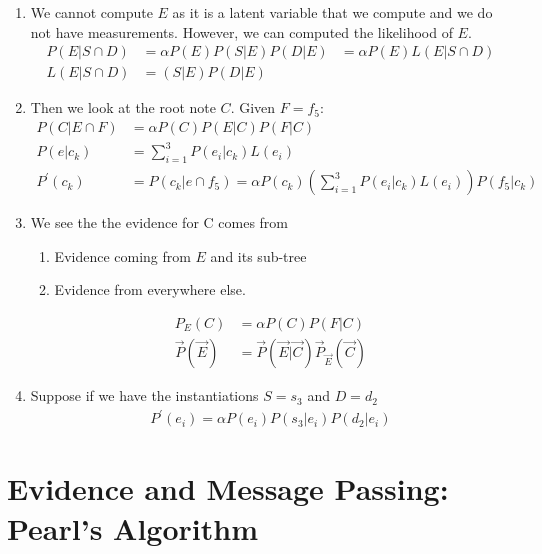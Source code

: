 \documentclass[12pt,twoside]{article}
\begin{document}
\begin{enumerate}
\begin{enumerate}
\item We cannot compute $E$ as it is a latent variable that we compute and we do not have measurements. However, we can computed the likelihood of $E$.
\begin{align*}
P(E \vert S\cap D) &= \alpha P(E)P(S\vert E)P(D\vert E)& = \alpha P(E) L(E\vert S \cap D)\\
L(E\vert S \cap D)& = (S\vert E)P(D\vert E)
\end{align*}  

\item Then we look at the root note $C$. Given $F=f_5$:
\begin{align*}
P(C \vert E \cap F)& = \alpha P(C) P(E\vert C)P(F\vert C)\\
P(e\vert c_k) &= \sum_{i=1}^3 P(e_i\vert c_k)L(e_i)\\
P^\prime (c_k)& = P(c_k\vert e \cap f_5)= \alpha P(c_k)\left(\sum_{i=1}^3 P(e_i\vert c_k)L(e_i)\right)P(f_5\vert c_k)
\end{align*}

\item We see the the evidence for C comes from
\begin{enumerate}
\item Evidence coming from $E$ and its sub-tree
\item Evidence from everywhere else.
\end{enumerate}
\begin{align*}
P_E(C) & = \alpha P(C) P(F\vert C)\\
\vec{P}(\vec{E}) & = \vec{P}(\vec{E}\vert \vec{C})\vec{P}_\vec{E}(\vec{C})
\end{align*}

\item Suppose if we have the instantiations $S=s_3$ and $D=d_2$
\begin{align*}
P^\prime(e_i) = \alpha P(e_i)P(s_3\vert e_i)P(d_2\vert e_i)
\end{align*}

\end{enumerate}

\end{enumerate}

\newpage

\section{Evidence and Message Passing: Pearl's Algorithm}
\end{document}
